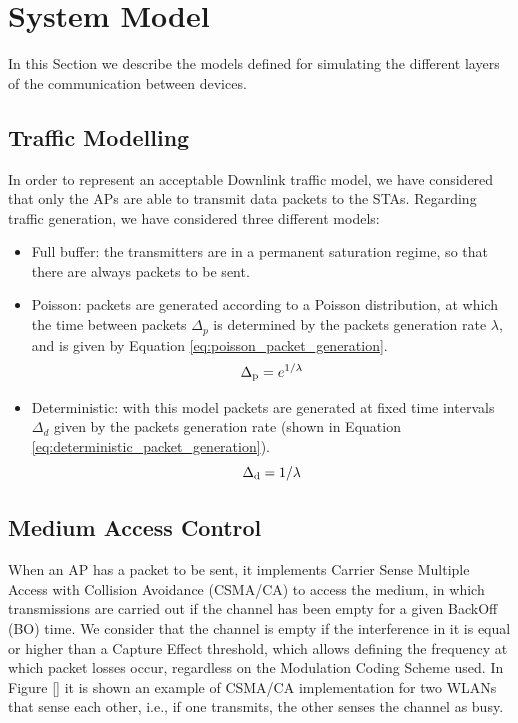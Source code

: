 \documentclass[a4paper]{article}
\begin{document}
\section{System Model}
\label{section:system_model}
In this Section we describe the models defined for simulating the different layers of the communication between devices.

\subsection{Traffic Modelling}
\label{section:traffic_modelling}
In order to represent an acceptable Downlink traffic model, we have considered that only the APs are able to transmit data packets to the STAs. Regarding traffic generation, we have considered three different models:
% 
% 
\begin{itemize}
\item Full buffer: the transmitters are in a permanent saturation regime, so that there are always packets to be sent.
\item Poisson: packets are generated according to a Poisson distribution, at which the time between packets $\Delta_p$ is determined by the packets generation rate $\lambda$, and is given by Equation \ref{eq:poisson_packet_generation}.
\begin{equation}
\label{eq:poisson_packet_generation}
	\Delta_{\rm p} = e^{1/\lambda}
\end{equation}
\item Deterministic: with this model packets are generated at fixed time intervals $\Delta_d$ given by the packets generation rate (shown in Equation \ref{eq:deterministic_packet_generation}).
\begin{equation}
\label{eq:deterministic_packet_generation}
	\Delta_{\rm d} = 1/\lambda
\end{equation}
\end{itemize}

\subsection{Medium Access Control}
\label{section:medium_access_control}
When an AP has a packet to be sent, it implements Carrier Sense Multiple Access with Collision Avoidance (CSMA/CA) to access the medium, in which transmissions are carried out if the channel has been empty for a given BackOff (BO) time. We consider that the channel is empty if the interference in it is equal or higher than a Capture Effect threshold, which allows defining the frequency at which packet losses occur, regardless on the Modulation Coding Scheme used. In Figure \ref{} it is shown an example of CSMA/CA implementation for two WLANs that sense each other, i.e., if one transmits, the other senses the channel as busy.
\end{document}
